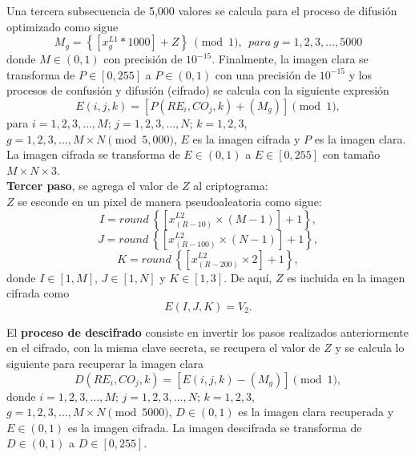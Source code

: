 Una tercera subsecuencia de 5,000 valores se calcula para el proceso de difusión optimizado como sigue
\begin{equation}
M_{g}=\left\lbrace \left[x_{g}^{L1}\ast 1000\right]+Z\right\rbrace~ \pmod 1, ~~para ~g=1,2,3,\ldots,5000 
\end{equation}
donde $M\in(0,1)$ con precisión de $10^{-15}$. Finalmente, la imagen clara se transforma de $P\in[0,255]$ a $P\in(0,1)$ con una precisión de $10^{-15}$ y los procesos de confusión y difusión (cifrado) se calcula con la siguiente expresión
\begin{equation}
E(i,j,k)=\left[P(RE_{i},CO_{j},k)+(M_{g})\right]\pmod 1,
\end{equation}
para $i=1,2,3,\ldots,M$; $j=1,2,3,\ldots,N$; $k=1,2,3$, $g=1,2,3,\ldots,M\times N\pmod{5,000}$, $E$ es la imagen cifrada y $P$ es la imagen clara. La imagen cifrada se transforma de $E\in(0,1)$ a $E\in[0,255]$ con tamaño $M\times N\times3$. \\

\textbf{Tercer paso}, se agrega el valor de $Z$ al criptograma: \\

$Z$ se esconde en un pixel de manera pseudoaleatoria como sigue:
\begin{equation}
I=round~\left\lbrace\left[x_{(R-10)}^{L2}\times(M-1)\right]+1\right\rbrace,
\end{equation}
\begin{equation}
J=round~\left\lbrace\left[x_{(R-100)}^{L2}\times(N-1)\right]+1\right\rbrace,
\end{equation}
\begin{equation}
K=round~\left\lbrace\left[x_{(R-200)}^{L2}\times2\right]+1\right\rbrace,
\end{equation}
donde $I\in[1,M]$, $J\in[1,N]$ y $K\in[1,3]$. De aquí, $Z$ es incluida en la imagen cifrada como 
\begin{equation}
E(I,J,K)=V_{2}.
\end{equation}

El \textbf{proceso de descifrado} consiste en invertir los pasos realizados anteriormente en el cifrado, con la misma clave secreta, se recupera el valor de $Z$ y se calcula lo siguiente para recuperar la imagen clara
\begin{equation}
D(RE_{i},CO_{j},k)= [E(i,j,k)-(M_{g})]\pmod 1,
\end{equation}
donde $i=1,2,3,\ldots,M$; $j=1,2,3,\ldots,N$; $k=1,2,3$, $g=1,2,3,\ldots,M\times N\pmod{5000}$, $D\in(0,1)$ es la imagen clara recuperada y $E\in(0,1)$ es la imagen cifrada. La imagen descifrada se transforma de $D\in(0,1)$ a $D\in[0,255]$. 

